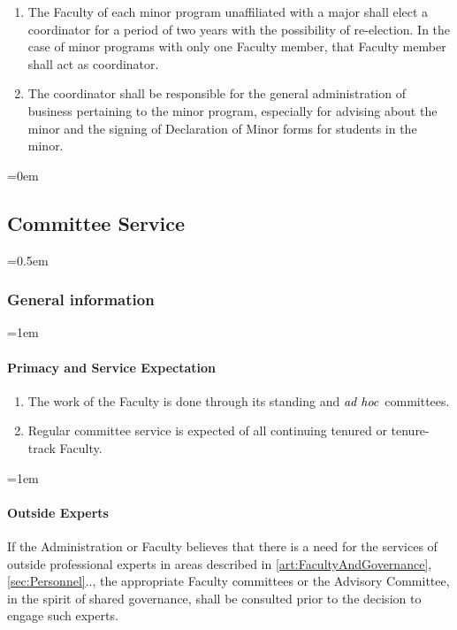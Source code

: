 \documentclass{manual}
\newcommand{\keyword}[1]{\textcolor{black}{#1}}
\newcommand{\adho}{\keyword{\textit{ad hoc}}~}
\let\oldsubsection\subsection
\renewcommand\subsection{\leftskip=0em\oldsubsection}
\let\oldsubsubsection\subsubsection
\renewcommand\subsubsection{\leftskip=0.5em\oldsubsubsection}
\let\oldparagraph\paragraph
\renewcommand\paragraph{\leftskip=1em\oldparagraph}
\newcommand{\itemLevelA}{\alph*.}
\newcommand{\itemRefA}{\alph*}
\begin{document}
	\begin{enumerate}[label=\itemLevelA,ref=\itemRefA]
	\item The Faculty of each minor program unaffiliated with a major shall elect a coordinator for a period of two years with the possibility of re-election. In the case of minor programs with only one Faculty member, that Faculty member shall act as coordinator.
	\item The coordinator shall be responsible for the general administration of business pertaining to the minor program, especially for advising about the minor and the signing of Declaration of Minor forms for students in the minor.
	\end{enumerate}

\subsection{Committee Service}\label{sec:CommitteeService}

\subsubsection{General information}\label{sub:GeneralInformation}

\paragraph{Primacy and Service Expectation}

	\begin{enumerate}[label=\itemLevelA,ref=\itemRefA]
	\item The work of the Faculty is done through its standing and \adho committees.
	\item Regular committee service is expected of all continuing tenured or tenure-track Faculty.
	\end{enumerate}

\paragraph{Outside Experts}
If the Administration or Faculty believes that there is a need for the services of outside professional experts in areas described in \cref{art:FacultyAndGovernance}, \cref{sec:Personnel}.., the appropriate Faculty committees or the Advisory Committee, in the spirit of shared governance, shall be consulted prior to the decision to engage such experts.
\end{document}
